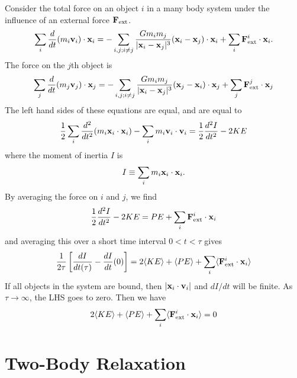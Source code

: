 \documentclass[]{article}
\begin{document}
Consider the total force on an object $i$ in 
a many body system under the influence of an external force $\mathbf{F}_{\mathrm{ext}}$.
\begin{equation}
\sum_i \frac{d}{dt} (m_i \mathbf{v}_i) \cdot \mathbf{x}_i = -\sum_{i,j; i\ne j} \frac{Gm_i m_j}{|\mathbf{x}_i - \mathbf{x}_j|^{3}} (\mathbf{x}_i - \mathbf{x}_j) \cdot \mathbf{x}_i + \sum_i \mathbf{F}_{\mathrm{ext}}^{i} \cdot \mathbf{x}_i.
\end{equation}
\noindent
The force on the $j$th object is
\begin{equation}
\sum_j \frac{d}{dt} (m_j \mathbf{v}_j) \cdot \mathbf{x}_j = - \sum_{i,j;i\ne j }\frac{G m_i m_j}{|\mathbf{x}_i - \mathbf{x}_j|^{3}}(\mathbf{x}_j - \mathbf{x}_i)\cdot\mathbf{x}_j + \sum_j \mathbf{F}_{\mathrm{ext}}^{j} \cdot \mathbf{x}_j
\end{equation}
\noindent
The left hand sides of these equations are equal, and are equal to
\begin{equation}
\frac{1}{2} \sum_i \frac{d^2}{dt^2}(m_i\mathbf{x}_i \cdot \mathbf{x}_i) - \sum_i m_i \mathbf{v}_i \cdot \mathbf{v}_i = \frac{1}{2} \frac{d^2I}{dt^2} -2 KE
\end{equation}
\noindent
where the moment of inertia $I$ is
\begin{equation}
I \equiv \sum_i m_i \mathbf{x}_i \cdot \mathbf{x}_i.
\end{equation}
\noindent
By averaging the force on $i$ and $j$, we find
\begin{equation}
\frac{1}{2} \frac{d^2 I}{dt^2} - 2 KE = PE + \sum_i \mathbf{F}_{\mathrm{ext}}^{i} \cdot \mathbf{x}_i
\end{equation}
\noindent
and averaging this over a short time interval $0<t<\tau$ gives
\begin{equation}
\frac{1}{2\tau}\left[ \frac{dI}{dt(\tau)} - \frac{dI}{dt}(0)\right] = 2 \langle KE\rangle + \langle PE\rangle + \sum_i \langle\mathbf{F}_{\mathrm{ext}}^{i} \cdot \mathbf{x}_i\rangle
\end{equation}
\noindent
If all objects in the system are bound, then $|\mathbf{x}_i \cdot \mathbf{v}_i|$ and $dI/dt$ will be finite.  As $\tau\to\infty$, the LHS goes to zero.  Then we have
\begin{equation}
2\langle KE\rangle + \langle PE\rangle + \sum_i \langle\mathbf{F}_{\mathrm{ext}}^{i} \cdot \mathbf{x}_i\rangle = 0
\end{equation}

\section{Two-Body Relaxation}
\end{document}
